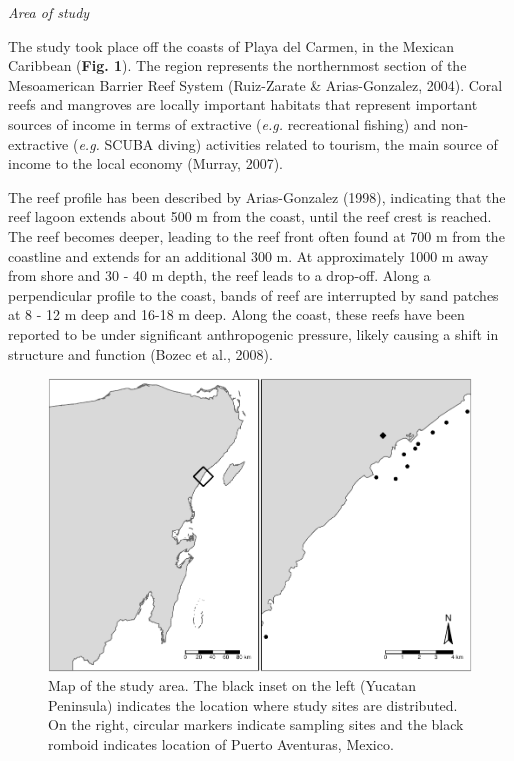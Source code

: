 \documentclass[12pt,]{article}
\begin{document}
\emph{Area of study}

The study took place off the coasts of Playa del Carmen, in the Mexican
Caribbean (\textbf{Fig. 1}). The region represents the northernmost
section of the Mesoamerican Barrier Reef System (Ruiz-Zarate \&
Arias-Gonzalez, 2004). Coral reefs and mangroves are locally important
habitats that represent important sources of income in terms of
extractive (\emph{e.g.} recreational fishing) and non-extractive
(\emph{e.g.} SCUBA diving) activities related to tourism, the main
source of income to the local economy (Murray, 2007).

The reef profile has been described by Arias-Gonzalez (1998), indicating
that the reef lagoon extends about 500 m from the coast, until the reef
crest is reached. The reef becomes deeper, leading to the reef front
often found at 700 m from the coastline and extends for an additional
300 m. At approximately 1000 m away from shore and 30 - 40 m depth, the
reef leads to a drop-off. Along a perpendicular profile to the coast,
bands of reef are interrupted by sand patches at 8 - 12 m deep and 16-18
m deep. Along the coast, these reefs have been reported to be under
significant anthropogenic pressure, likely causing a shift in structure
and function (Bozec et al., 2008).

\begin{figure}[htbp]
\centering
\includegraphics{Manuscript_files/figure-latex/create map-1.pdf}
\caption{Map of the study area. The black inset on the left (Yucatan
Peninsula) indicates the location where study sites are distributed. On
the right, circular markers indicate sampling sites and the black
romboid indicates location of Puerto Aventuras, Mexico.}
\end{figure}
\end{document}
